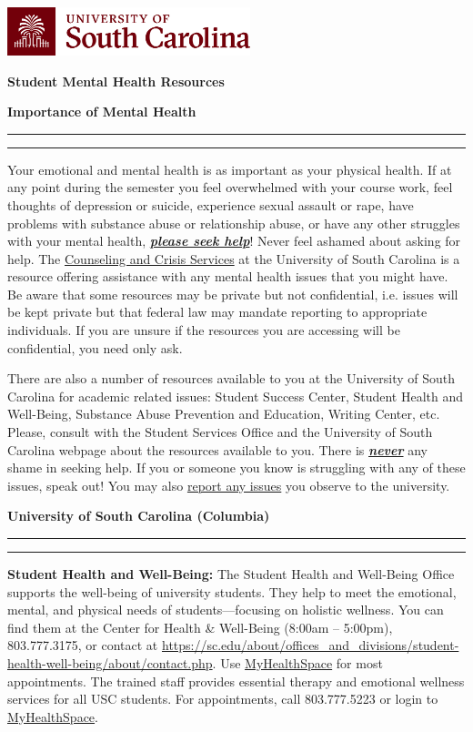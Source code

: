 \documentclass[11pt,letterpaper]{article}
\newcommand{\mytitle}[1]{%
\begin{center}
\includegraphics[width=0.53\textwidth]{usc_horzlogo.png} \par\vspace{-0.2cm}
\huge\bfseries\color{scred} #1
\end{center} \par\vspace{0.2\baselineskip}%
}
\newcommand{\mysection}[2]{%
\begin{minipage}{\textwidth}
\phantomsection
	{%
\large\bfseries\color{scred}
#2 \par\vspace{-0.62\baselineskip}
\noindent\rule{#1\textwidth}{1.5pt} \par
\vspace{-0.3cm}\noindent\rule{0.13\textwidth}{5.1pt}%
	}%
\end{minipage}\par\vspace{4\lineskip}%
}
\newcommand{\colortext}[1]{{\bfseries\color{scred}#1}}
\newcommand{\pspecial}{\par\vspace{0.3\baselineskip}}
\begin{document}
\mytitle{Student Mental Health Resources}

\mysection{0.37}{Importance of Mental Health}
Your emotional and mental health is as important as your physical health. If at any point during the semester you feel overwhelmed with your course work, feel thoughts of depression or suicide, experience sexual assault or rape, have problems with substance abuse or relationship abuse, or have any other struggles with your mental health, \underline{\bfseries\itshape please seek help}! Never feel ashamed about asking for help. The \href{https://sc.edu/about/offices\_and\_divisions/student-health-well-being/mental-health/counseling-and-psychiatry/index.php}{Counseling and Crisis Services} at the University of South Carolina is a resource offering assistance with any mental health issues that you might have. Be aware that some resources may be private but not confidential, i.e. issues will be kept private but that federal law may mandate reporting to appropriate individuals. If you are unsure if the resources you are accessing will be confidential, you need only ask. \pspecial

There are also a number of resources available to you at the University of South Carolina for academic related issues: Student Success Center, Student Health and Well-Being, Substance Abuse Prevention and Education, Writing Center, etc. Please, consult with the Student Services Office and the University of South Carolina webpage about the resources available to you. There is \underline{\bfseries\itshape never} any shame in seeking help. If you or someone you know is struggling with any of these issues, speak out! You may also \href{https://cm.maxient.com/reportingform.php?UnivofSouthCarolina&layout_id=3}{report any issues} you observe to the university. \par\vspace{0.7\baselineskip}



\mysection{0.51}{University of South Carolina (Columbia)}

\colortext{Student Health and Well-Being:} The Student Health and Well-Being Office supports the well-being of university students. They help to meet the emotional, mental, and physical needs of students---focusing on holistic wellness. You can find them at the Center for Health \& Well-Being (8:00am -- 5:00pm), 803.777.3175, or contact at \url{https://sc.edu/about/offices\_and\_divisions/student-health-well-being/about/contact.php}. Use \href{https://myhealthspace.ushs.sc.edu/login\_dualauthentication.aspx}{MyHealthSpace} for most appointments. The trained staff provides essential therapy and emotional wellness services for all USC students. For appointments, call 803.777.5223 or login to \href{https://myhealthspace.ushs.sc.edu/login\_dualauthentication.aspx}{MyHealthSpace}. \pspecial
\end{document}
